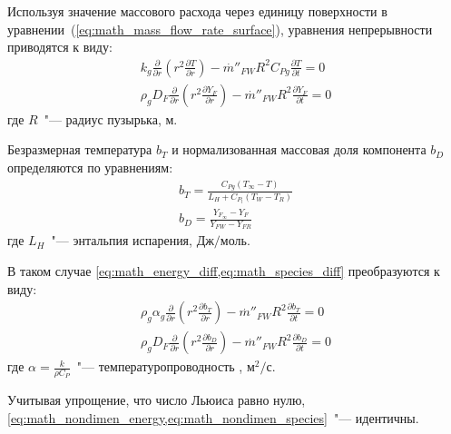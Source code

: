 Используя значение массового расхода через единицу поверхности в уравнении~(\ref{eq:math_mass_flow_rate_surface}), уравнения непрерывности приводятся к виду:
\begin{gather}
 {k}_{g}\frac{\partial }{\partial r}\left({r}^{2}\frac{\partial T}{\partial r}\right)-{\stackrel{.}{m}}''_{FW}R^{2}{C}_{Pg}\frac{\partial T}{\partial
t}=0\label{eq:math_energy_final}\\
 {\rho}_{g}D_{F}\frac{\partial }{\partial r}\left({r}^{2}\frac{\partial Y_{F}}{\partial r}\right)-{\stackrel{.}{m}}''_{FW}R^{2}{}\frac{\partial Y_{F}}{\partial
t}=0\label{eq:math_species_final}
\end{gather}
где \(R\)~"--- радиус пузырька, \(\text{м}\).

Безразмерная температура \(b_{T}\) и нормализованная массовая доля компонента \(b_{D}\) определяются по уравнениям:
\begin{gather}
 {b}_{T}=\frac{{C}_{Pg}\left({T}_{\infty }-T\right)}{{L}_{H}+{C}_{{P}_{l}}\left({T}_{W}-{T}_{R}\right)}\\
 {b}_{D}=\frac{{Y}_{{F}_{\infty }}-{Y}_{F}}{{Y}_{FW}-{Y}_{FR}} 
\end{gather}
где \({L}_{H}\)~"--- энтальпия испарения, \(\text{Дж}/\text{моль}\).

В таком случае \cref{eq:math_energy_diff,eq:math_species_diff} преобразуются к виду:
\begin{gather}
 {\rho}_{g}\alpha_{g}\frac{\partial }{\partial r}\left({r}^{2}\frac{\partial{b}_{T}}{\partial r}\right)-{\stackrel{.}{m}}''_{FW}R^{2}\frac{\partial
 {b}_{T}}{\partial t}=0\label{eq:math_nondimen_energy}\\
 {\rho}_{g}D_{F}\frac{\partial }{\partial r}\left({r}^{2}\frac{\partial{b}_{D}}{\partial r}\right)-{\stackrel{.}{m}}''_{FW}R^{2}{}\frac{\partial{b}_{D}}{\partial
t}=0\label{eq:math_nondimen_species}
\end{gather}
где \(\alpha= \frac{k}{\rho {C}_{P}} \)~"--- температуропроводность , \(\text{м}^{2}/\text{с}\).

Учитывая упрощение, что число Льюиса равно нулю, \cref{eq:math_nondimen_energy,eq:math_nondimen_species}~"--- идентичны.

